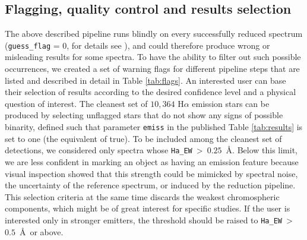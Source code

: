 \subsection{Flagging, quality control and results selection}
\label{sec:flagging}
The above described pipeline runs blindly on every successfully reduced spectrum (\texttt{guess\_flag} = 0, for details see \citet{2017MNRAS.464.1259K}), and could therefore produce wrong or misleading results for some spectra. To have the ability to filter out such possible occurrences, we created a set of warning flags for different pipeline steps that are listed and described in detail in Table \ref{tab:flags}. An interested user can base their selection of results according to the desired confidence level and a physical question of interest. The cleanest set of $10,364$ H$\alpha$ emission stars can be produced by selecting unflagged stars that do not show any signs of possible binarity, defined such that parameter \texttt{emiss} in the published Table \ref{tab:results} is set to one (the equivalent of true). To be included among the cleanest set of detections, we considered only spectra whose \texttt{Ha\_EW}~>~$0.25$~\AA. Below this limit, we are less confident in marking an object as having an emission feature because visual inspection showed that this strength could be mimicked by spectral noise, the uncertainty of the reference spectrum, or induced by the reduction pipeline. This selection criteria at the same time discards the weakest chromospheric components, which might be of great interest for specific studies. If the user is interested only in stronger emitters, the threshold should be raised to \texttt{Ha\_EW}~>~$0.5$~\AA\ or above.

